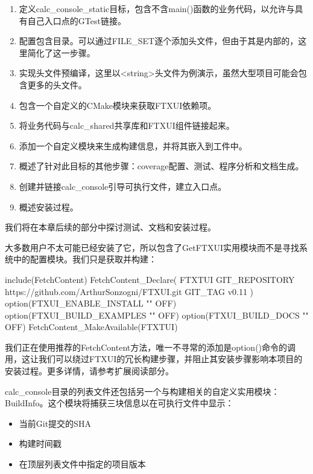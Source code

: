 \begin{enumerate}
\item
定义calc\_console\_static目标，包含不含main()函数的业务代码，以允许与具有自己入口点的GTest链接。

\item
配置包含目录。可以通过FILE\_SET逐个添加头文件，但由于其是内部的，这里简化了这一步骤。

\item
实现头文件预编译，这里以<string>头文件为例演示，虽然大型项目可能会包含更多的头文件。

\item
包含一个自定义的CMake模块来获取FTXUI依赖项。

\item
将业务代码与calc\_shared共享库和FTXUI组件链接起来。

\item
添加一个自定义模块来生成构建信息，并将其嵌入到工件中。

\item
概述了针对此目标的其他步骤：coverage配置、测试、程序分析和文档生成。

\item
创建并链接calc\_console引导可执行文件，建立入口点。

\item
概述安装过程。
\end{enumerate}

我们将在本章后续的部分中探讨测试、文档和安装过程。

大多数用户不太可能已经安装了它，所以包含了GetFTXUI实用模块而不是寻找系统中的配置模块。我们只是获取并构建：


\begin{cmake}
include(FetchContent)
FetchContent_Declare(
    FTXTUI
    GIT_REPOSITORY https://github.com/ArthurSonzogni/FTXUI.git
    GIT_TAG v0.11
)
option(FTXUI_ENABLE_INSTALL "" OFF)
option(FTXUI_BUILD_EXAMPLES "" OFF)
option(FTXUI_BUILD_DOCS "" OFF)
FetchContent_MakeAvailable(FTXTUI)
\end{cmake}

我们正在使用推荐的FetchContent方法，唯一不寻常的添加是option()命令的调用，这让我们可以绕过FTXUI的冗长构建步骤，并阻止其安装步骤影响本项目的安装过程。更多详情，请参考扩展阅读部分。

calc\_console目录的列表文件还包括另一个与构建相关的自定义实用模块：BuildInfo。这个模块将捕获三块信息以在可执行文件中显示：

\begin{itemize}
\item
当前Git提交的SHA

\item
构建时间戳

\item
在顶层列表文件中指定的项目版本
\end{itemize}


